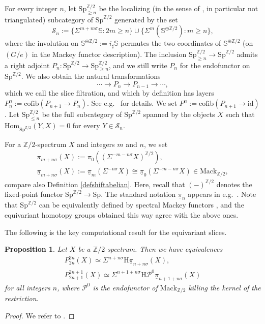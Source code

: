 \documentclass[10pt]{amsart}
\newtheorem{prop}[thm]{Proposition}
\theoremstyle{definition}
\numberwithin{equation}{section}
\newcommand{\Sphere}{\mathbb{S}}
\newcommand{\Z}{\mathbb{Z}}
\newcommand{\cP}{\mathcal{P}}
\newcommand{\cS}{\mathcal{S}}
\newcommand{\rH}{\mathrm{H}}
\newcommand{\ul}{\underline}
\newcommand{\Mack}{\mathrm{Mack}}
\newcommand{\Sp}{\mathrm{Sp}}
\newcommand{\Hom}{\mathrm{Hom}}
\newcommand{\cofib}{\mathrm{cofib}}
\newcommand{\id}{\mathrm{id}}
\begin{document}
For every integer $n$,
let $\Sp_{\geq n}^{\Z/2}$ be the localizing (in the sense of \cite[Definition 6.3.12]{HHR21}, in particular not triangulated) subcategory of $\Sp^{\Z/2}$ generated by the set
\[
\cS_n
:=
\{
\Sigma^{m+m\sigma} \Sphere
:
2m\geq n
\}
\cup
\{
\Sigma^{m} (\Sphere^{\oplus \Z/2})
:
m\geq n
\},
\]
where the involution on $\Sphere^{\oplus \Z/2}:=i_\sharp \Sphere$ permutes the two coordinates of $\Sphere^{\oplus \Z/2}$ (on $(G/e)$ in the Mackey functor description).
The inclusion $\Sp_{\geq n}^{\Z/2}\to \Sp^{\Z/2}$ admits a right adjoint $P_n\colon \Sp^{\Z/2}\to \Sp_{\geq n}^{\Z/2}$,
and we still write $P_n$ for the endofunctor on $\Sp^{\Z/2}$.
We also obtain the natural transformations
\[
\cdots \to P_n \to P_{n-1}\to \cdots,
\]
which we call the slice filtration, and which by definition has
layers $P_n^n:=\cofib(P_{n+1}\to P_n)$.
See e.g.\ \cite[section 11.1.E]{HHR21} for details.
We set $P^{n}:=\cofib(P_{n+1} \to \id)$.
Let $\Sp_{\leq n}^{\Z/2}$ be the full subcategory of $\Sp^{\Z/2}$ spanned by the objects $X$ such that $\Hom_{\Sp^{\Z/2}}(Y,X)=0$ for every $Y\in \cS_n$.




For a $\Z/2$-spectrum $X$ and integers $m$ and $n$,
we set
\begin{gather*}
\pi_{m+n\sigma}(X)
:=
\pi_0((\Sigma^{-m-n\sigma}X)^{\Z/2}),
\\
\ul{\pi}_{m+n\sigma}(X)
:=
\ul{\pi}_m(\Sigma^{-n\sigma} X)
\cong
\ul{\pi}_0(\Sigma^{-m-n\sigma} X)
\in
\Mack_{\Z/2},
\end{gather*}
compare also Definition \ref{defshiftabelian}.
Here, recall that $(-)^{\Z/2}$ denotes the fixed-point functor $\Sp^{\Z/2}\to \Sp$.
The standard notation $\ul{\pi}_n$ appears in e.g.\ \cite[section 3]{HHR}.
Note that $\Sp^{\Z/2}$ can be equivalently defined by spectral Mackey functors \cite{Bar17}, and the equivariant homotopy groups obtained this way agree with the above ones.


The following is the key computational result for the equivariant slices.

\begin{prop}\label{slicesexplicit}
Let $X$ be a $\Z/2$-spectrum.
Then we have equivalences
\begin{gather*}
P_{2n}^{2n}(X)
\simeq
\Sigma^{n+n\sigma} \rH \ul{\pi}_{n+n\sigma}(X),
\\
P_{2n+1}^{2n+1}(X)
\simeq
\Sigma^{n+1+n\sigma}  \rH \cP^0 \ul{\pi}_{n+1+n\sigma}(X)
\end{gather*}
for all integers $n$,
where $\cP^0$
is the endofunctor of $\Mack_{\Z/2}$ killing the kernel of the restriction.
\end{prop}
\begin{proof}
We refer to \cite[Theorem 17.5.25]{Hil20}.
\end{proof}
\end{document}
